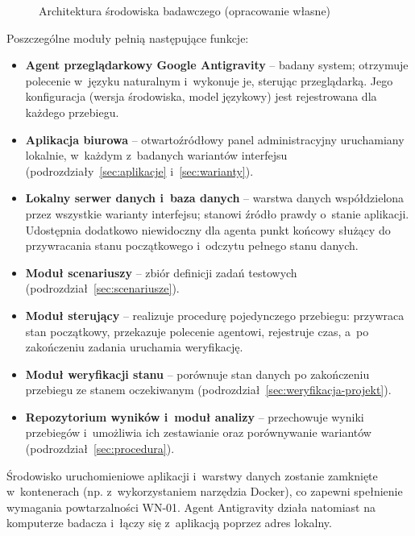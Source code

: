 \begin{figure}[H]
\caption{Architektura środowiska badawczego (opracowanie własne)}
\label{fig:architektura}
\end{figure}

Poszczególne moduły pełnią następujące funkcje:
\begin{itemize}
    \item \textbf{Agent przeglądarkowy Google Antigravity} -- badany system; otrzymuje polecenie w~języku naturalnym i~wykonuje je, sterując przeglądarką. Jego konfiguracja (wersja środowiska, model językowy) jest rejestrowana dla każdego przebiegu.
    \item \textbf{Aplikacja biurowa} -- otwartoźródłowy panel administracyjny uruchamiany lokalnie, w~każdym z~badanych wariantów interfejsu (podrozdziały~\ref{sec:aplikacje} i~\ref{sec:warianty}).
    \item \textbf{Lokalny serwer danych i~baza danych} -- warstwa danych współdzielona przez wszystkie warianty interfejsu; stanowi źródło prawdy o~stanie aplikacji. Udostępnia dodatkowo niewidoczny dla agenta punkt końcowy służący do przywracania stanu początkowego i~odczytu pełnego stanu danych.
    \item \textbf{Moduł scenariuszy} -- zbiór definicji zadań testowych (podrozdział~\ref{sec:scenariusze}).
    \item \textbf{Moduł sterujący} -- realizuje procedurę pojedynczego przebiegu: przywraca stan początkowy, przekazuje polecenie agentowi, rejestruje czas, a~po zakończeniu zadania uruchamia weryfikację.
    \item \textbf{Moduł weryfikacji stanu} -- porównuje stan danych po zakończeniu przebiegu ze stanem oczekiwanym (podrozdział~\ref{sec:weryfikacja-projekt}).
    \item \textbf{Repozytorium wyników i~moduł analizy} -- przechowuje wyniki przebiegów i~umożliwia ich zestawianie oraz porównywanie wariantów (podrozdział~\ref{sec:procedura}).
\end{itemize}

Środowisko uruchomieniowe aplikacji i~warstwy danych zostanie zamknięte w~kontenerach (np. z~wykorzystaniem narzędzia Docker), co zapewni spełnienie wymagania powtarzalności WN-01. Agent Antigravity działa natomiast na komputerze badacza i~łączy się z~aplikacją poprzez adres lokalny.

